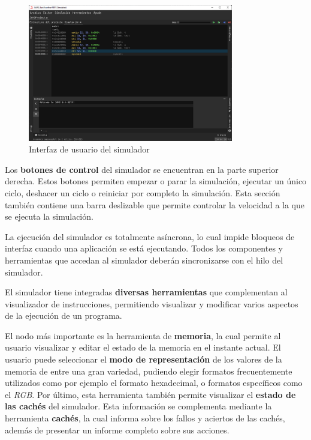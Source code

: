 \begin{figure}[h]
    \centering
    \includegraphics[width=0.8\textwidth]{images/mips/jams-simulation}
    \caption{Interfaz de usuario del simulador}
    \label{fig:jams-simulation}
\end{figure}

Los \textbf{botones de control} del simulador se encuentran
en la parte superior derecha.
Estos botones permiten empezar o parar la simulación, ejecutar un
único ciclo, deshacer un ciclo o reiniciar por completo la simulación.
Esta sección también contiene una barra deslizable que permite controlar
la velocidad a la que se ejecuta la simulación.

La ejecución del simulador es totalmente asíncrona, lo cual
impide bloqueos de interfaz cuando una aplicación se está ejecutando.
Todos los componentes y herramientas que accedan al simulador
deberán sincronizarse con el hilo del simulador.

El simulador tiene integradas \textbf{diversas herramientas} que complementan
al visualizador de instrucciones, permitiendo visualizar y modificar varios
aspectos de la ejecución de un programa.

El nodo más importante es la herramienta de \textbf{memoria},
la cual permite al usuario visualizar y editar el estado de la memoria
en el instante actual.
El usuario puede seleccionar el \textbf{modo de representación} de los valores
de la memoria de entre una gran variedad, pudiendo elegir formatos
frecuentemente utilizados como por ejemplo el formato hexadecimal,
o formatos específicos como el \textit{RGB}.
Por último, esta herramienta también permite visualizar el \textbf{estado
de las cachés} del simulador.
Esta información se complementa mediante la herramienta \textbf{cachés},
la cual informa sobre los fallos y aciertos de las cachés,
además de presentar un informe completo sobre sus acciones.

